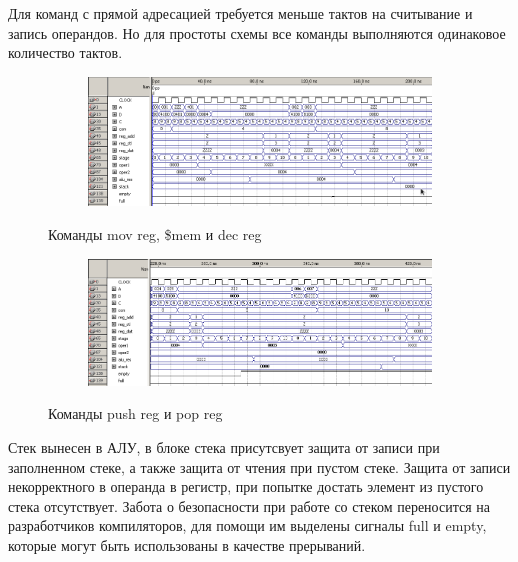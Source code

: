 Для команд с прямой адресацией требуется меньше тактов на считывание и запись операндов. Но для простоты схемы все команды выполняются одинаковое количество тактов.

\begin{figure}[ht]
\centering
  \begin{subfigure}[b]{\textwidth}
    \centering
    \includegraphics[scale=0.69]{pc_wave1_part1}
    \caption{}
  \end{subfigure}
    \caption{Команды mov reg, \$mem и dec reg}
\end{figure}

\begin{figure}[ht]
\centering
  \begin{subfigure}[b]{\textwidth}
    \centering
    \includegraphics[scale=0.67]{pc_wave1_part2}
    \caption{}
  \end{subfigure}
    \caption{Команды push reg и pop reg}
\end{figure}

Стек вынесен в АЛУ, в блоке стека присутсвует защита от записи при заполненном стеке, а также защита от чтения при пустом стеке.
Защита от записи некорректного в операнда в регистр, при попытке достать элемент из пустого стека отсутствует.
Забота о безопасности при работе со стеком переносится на разработчиков компиляторов, для помощи им выделены сигналы full и empty, которые могут быть использованы в качестве прерываний.

